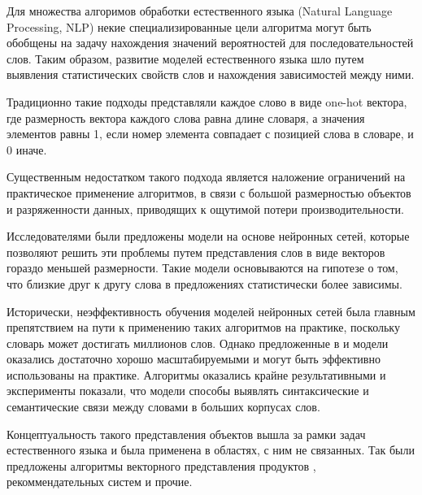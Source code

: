 \documentclass[times,specification,annotation]{itmo-student-thesis}
\begin{document}
Для множества алгоримов обработки естественного языка (Natural Language Processing, NLP) некие специализированные цели алгоритма могут быть обобщены на задачу нахождения значений вероятностей для последовательностей слов.
Таким образом, развитие моделей естественного языка шло путем выявления статистических свойств слов и нахождения зависимостей между ними.

Традиционно такие подходы представляли каждое слово в виде one-hot вектора, где размерность вектора каждого слова равна длине словаря, а значения элементов равны 1, если номер элемента совпадает с позицией слова в словаре, и 0 иначе.  

Существенным недостатком такого подхода является наложение ограничений на практическое применение алгоритмов, в связи с большой размерностью объектов и разряженности данных, приводящих к ощутимой потери производительности.

Исследователями были предложены модели на основе нейронных сетей\cite{turian2010}, которые позволяют решить эти проблемы путем представления слов в виде векторов гораздо меньшей размерности. Такие модели основываются на гипотезе о том, что близкие друг к другу слова в предложениях статистически более зависимы.

Исторически, неэффективность обучения моделей нейронных сетей была главным препятствием на пути к применению таких алгоритмов на практике, поскольку словарь может достигать миллионов слов. Однако предложенные в \cite{mikolov2013efficient} и \cite{mikolov2013distributed} модели оказались достаточно хорошо масштабируемыми и могут быть эффективно использованы на практике. Алгоритмы оказались крайне результативными и эксперименты показали, что модели способы выявлять синтаксические и семантические связи между словами в больших корпусах слов. 

Концептуальность такого представления объектов вышла за рамки задач естественного языка и была применена в областях, с ним не связанных. Так были предложены алгоритмы векторного представления продуктов \cite{grbovic2015commerce}, рекоммендательных систем \cite{ozsoy2016word} и прочие.


\end{document}
